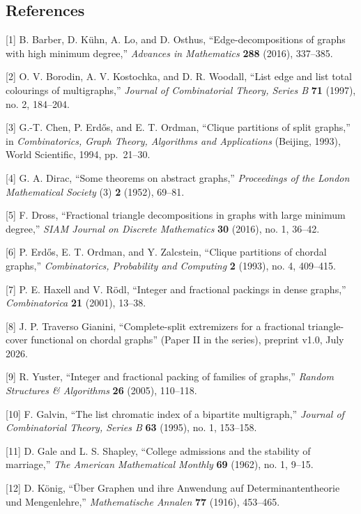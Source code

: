 \documentclass[
  11pt,
]{article}
\begin{document}
\subsection{References}\label{references}

{[}1{]} B. Barber, D. Kühn, A. Lo, and D. Osthus, ``Edge-decompositions of graphs with high minimum degree,'' \emph{Advances in Mathematics} \textbf{288} (2016), 337--385.

{[}2{]} O. V. Borodin, A. V. Kostochka, and D. R. Woodall, ``List edge and list total colourings of multigraphs,'' \emph{Journal of Combinatorial Theory, Series B} \textbf{71} (1997), no. 2, 184--204.

{[}3{]} G.-T. Chen, P. Erdős, and E. T. Ordman, ``Clique partitions of split graphs,'' in \emph{Combinatorics, Graph Theory, Algorithms and Applications} (Beijing, 1993), World Scientific, 1994, pp.~21--30.

{[}4{]} G. A. Dirac, ``Some theorems on abstract graphs,'' \emph{Proceedings of the London Mathematical Society} (3) \textbf{2} (1952), 69--81.

{[}5{]} F. Dross, ``Fractional triangle decompositions in graphs with large minimum degree,'' \emph{SIAM Journal on Discrete Mathematics} \textbf{30} (2016), no. 1, 36--42.

{[}6{]} P. Erdős, E. T. Ordman, and Y. Zalcstein, ``Clique partitions of chordal graphs,'' \emph{Combinatorics, Probability and Computing} \textbf{2} (1993), no. 4, 409--415.

{[}7{]} P. E. Haxell and V. Rödl, ``Integer and fractional packings in dense graphs,'' \emph{Combinatorica} \textbf{21} (2001), 13--38.

{[}8{]} J. P. Traverso Gianini, ``Complete-split extremizers for a fractional triangle-cover functional on chordal graphs'' (Paper II in the series), preprint v1.0, July 2026.

{[}9{]} R. Yuster, ``Integer and fractional packing of families of graphs,'' \emph{Random Structures \& Algorithms} \textbf{26} (2005), 110--118.

{[}10{]} F. Galvin, ``The list chromatic index of a bipartite multigraph,'' \emph{Journal of Combinatorial Theory, Series B} \textbf{63} (1995), no. 1, 153--158.

{[}11{]} D. Gale and L. S. Shapley, ``College admissions and the stability of marriage,'' \emph{The American Mathematical Monthly} \textbf{69} (1962), no. 1, 9--15.

{[}12{]} D. König, ``Über Graphen und ihre Anwendung auf Determinantentheorie und Mengenlehre,'' \emph{Mathematische Annalen} \textbf{77} (1916), 453--465.
\end{document}
